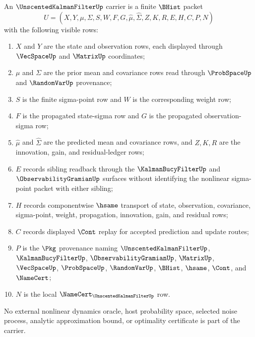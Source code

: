 \begin{definition}
\label{def:unscented-kalman-filter-carrier}
An $\UnscentedKalmanFilterUp$ carrier is a finite $\BHist$ packet
$$
U=(X,Y,\mu,\Sigma,S,W,F,G,\widehat{\mu},\widehat{\Sigma},Z,K,R,E,H,C,P,N)
$$
with the following visible rows:
\begin{enumerate}
\item $X$ and $Y$ are the state and observation rows, each displayed through $\VecSpaceUp$ and $\MatrixUp$ coordinates;
\item $\mu$ and $\Sigma$ are the prior mean and covariance rows read through $\ProbSpaceUp$ and $\RandomVarUp$ provenance;
\item $S$ is the finite sigma-point row and $W$ is the corresponding weight row;
\item $F$ is the propagated state-sigma row and $G$ is the propagated observation-sigma row;
\item $\widehat{\mu}$ and $\widehat{\Sigma}$ are the predicted mean and covariance rows, and $Z,K,R$ are the innovation, gain, and residual-ledger rows;
\item $E$ records sibling readback through the $\KalmanBucyFilterUp$ and $\ObservabilityGramianUp$ surfaces without identifying the nonlinear sigma-point packet with either sibling;
\item $H$ records componentwise $\hsame$ transport of state, observation, covariance, sigma-point, weight, propagation, innovation, gain, and residual rows;
\item $C$ records displayed $\Cont$ replay for accepted prediction and update routes;
\item $P$ is the $\Pkg$ provenance naming $\UnscentedKalmanFilterUp$, $\KalmanBucyFilterUp$, $\ObservabilityGramianUp$, $\MatrixUp$, $\VecSpaceUp$, $\ProbSpaceUp$, $\RandomVarUp$, $\BHist$, $\hsame$, $\Cont$, and $\NameCert$;
\item $N$ is the local $\NameCert_{\UnscentedKalmanFilterUp}$ row.
\end{enumerate}
No external nonlinear dynamics oracle, host probability space, selected noise process, analytic approximation bound, or optimality certificate is part of the carrier.
\end{definition}

